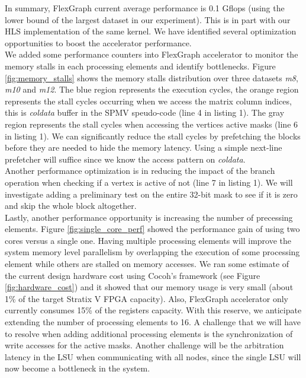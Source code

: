 In summary, FlexGraph current average performance is 0.1 Gflops (using the lower bound of the largest dataset in our experiment). This is in part with our HLS implementation of the same kernel. We have identified several optimization opportunities to boost the accelerator performance.\\
We added some performance counters into FlexGraph accelerator to monitor the memory stalls in each processing elements and identify bottlenecks. Figure \ref{fig:memory_stalls} shows the memory stalls distribution over three datasets \textit{m8}, \textit{m10} and \textit{m12}. The blue region represents the execution cycles, the orange region represents the stall cycles occurring when we access the matrix column indices, this is \textit{coldata} buffer in the SPMV speudo-code (line 4 in listing 1). The gray region represents the stall cycles when accessing the vertices active masks (line 6 in listing 1). We can significantly reduce the stall cycles by prefetching the blocks before they are needed to hide the memory latency. Using a simple next-line prefetcher will suffice since we know the access pattern on \textit{coldata}.\\
Another performance optimization is in reducing the impact of the branch operation when checking if a vertex is active of not (line 7 in listing 1). We will investigate adding a preliminary test on the entire 32-bit mask to see if it is zero and skip the whole block altogether.\\ 
Lastly, another performance opportunity is increasing the number of precessing elements. Figure \ref{fig:single_core_perf} showed the performance gain of using two cores versus a single one. Having multiple processing elements will improve the system memory level parallelism by overlapping the execution of some processing element while others are stalled on memory accesses. We ran some estimate of the current design hardware cost using Cocoh's framework (see Figure \ref{fig:hardware_cost}) and it showed that our memory usage is very small (about 1\% of the target Stratix V FPGA capacity). Also, FlexGraph accelerator only currently consumes 15\% of the registers capacity. With this reserve, we anticipate extending the number of processing elements to 16. A challenge that we will have to resolve when adding additional processing elements is the synchronization of write accesses for the active masks. Another challenge will be the arbitration latency in the LSU when communicating with all nodes,    since the single LSU will now become a bottleneck in the system.